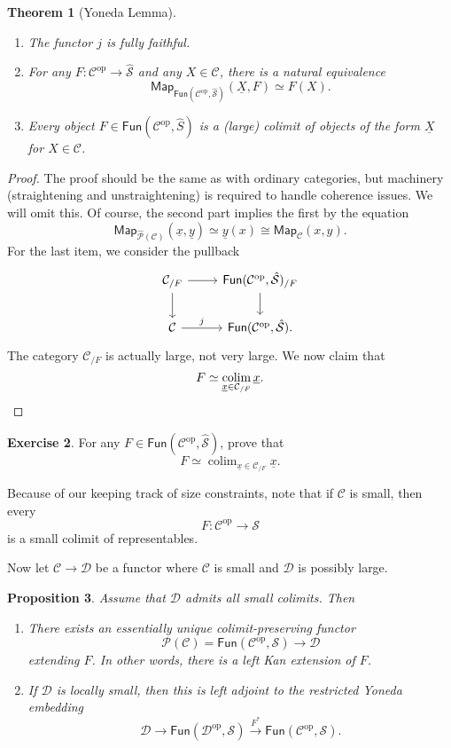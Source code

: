 \documentclass[10pt, oneside]{memoir}
\newtheorem{thm}{Theorem}[subsection]
\newtheorem{prop}[thm]{Proposition}
\theoremstyle{definition}
\newtheorem{exer}[thm]{Exercise}
\theoremstyle{remark}
\theoremstyle{plain}
\theoremstyle{definition}
\theoremstyle{remark}
\newcommand{\mc}[1]{\mathcal{#1}}
\newcommand{\ms}[1]{\mathsf{#1}}
\newcommand{\ul}[1]{\underline{#1}}
\newcommand{\1}{\mathbf{1}}
\newcommand{\2}{\mathbf{2}}
\newcommand{\3}{\mathbf{3}}
\DeclareMathOperator{\op}{op}
\DeclareMathOperator*{\colim}{colim}
\begin{document}
\begin{thm}[Yoneda Lemma]\leavevmode
    \begin{enumerate}
        \item The functor $j$ is fully faithful.
        \item For any $F \colon \mc{C}^{\op} \to \hat{\mc{S}}$ and any $X \in \mc{C}$, there is a natural equivalence
        \[ \ms{Map}_{\ms{Fun}(\mc{C}^{\op}, \hat{\mc{S}})}(\ul{X}, F) \simeq F(X). \]
        \item Every object $F \in \ms{Fun}(\mc{C}^{\op}, \hat{S})$ is a (large) colimit of objects of the form $\ul{X}$ for $X \in \mc{C}$.
    \end{enumerate}
\end{thm}

\begin{proof}
    The proof should be the same as with ordinary categories, but machinery (straightening and unstraightening) is required to handle coherence issues. We will omit this. Of course, the second part implies the first by the equation
    \[ \ms{Map}_{\hat{\mc{P}}(\mc{C})}(\ul{x}, \ul{y}) \simeq \ul{y}(x) \cong \ms{Map}_{\mc{C}}(x,y). \]
    For the last item, we consider the pullback
    \begin{equation*}
    \begin{tikzcd}
        \mc{C}_{/F} \ar{r} \ar{d} & \ms{Fun}(\mc{C}^{\op}, \hat{\mc{S}})_{/F} \ar{d} \\
        \mc{C} \ar{r}{j} & \ms{Fun}(\mc{C}^{\op}, \hat{\mc{S}}).
    \end{tikzcd}
    \end{equation*}
    The category $\mc{C}_{/F}$ is actually large, not very large. We now claim that
    \[ F \simeq \colim_{\ul{x} \in \mc{C}_{/F}} \ul{x}. \qedhere \]
\end{proof}

\begin{exer}
    For any $F \in \ms{Fun}(\mc{C}^{\op}, \hat{\mc{S}})$, prove that
    \[ F \simeq \colim_{\ul{x} \in \mc{C}_{/F}} \ul{x}. \]
\end{exer}

Because of our keeping track of size constraints, note that if $\mc{C}$ is small, then every
\[ F \colon \mc{C}^{\op} \to \mc{S} \]
is a small colimit of representables.

Now let $\mc{C} \to \mc{D}$ be a functor where $\mc{C}$ is small and $\mc{D}$ is possibly large.

\begin{prop}
    Assume that $\mc{D}$ admits all small colimits. Then
    \begin{enumerate}
        \item There exists an essentially unique colimit-preserving functor
        \[ \mc{P}(\mc{C}) = \ms{Fun}(\mc{C}^{\op}, \mc{S}) \to \mc{D} \]
        extending $F$. In other words, there is a left Kan extension of $F$.
        \item If $\mc{D}$ is locally small, then this is left adjoint to the restricted Yoneda embedding
        \[ \mc{D} \to \ms{Fun}(\mc{D}^{\op}, \mc{S}) \xrightarrow{F^*} \ms{Fun}(\mc{C}^{\op}, \mc{S}). \]
    \end{enumerate}
\end{prop}
\end{document}
